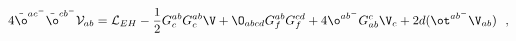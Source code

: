 \begin{equation}
 4 \tilde\o^{ac^-}\tilde\o^{cb^-}{\cal V}_{ab}=
{\cal L}_{EH} - {1\over 2}G^{ab}_c G^{ab}_c\V
+\O_{abcd}G^{ab}_f G^{cd}_f
+4 \o^{ab^-}G_{ab}^c\V_c
+2 d(\ot^{ab^-}\V_{ab}) \ \ ,
\label{omega^2}
\end{equation}

